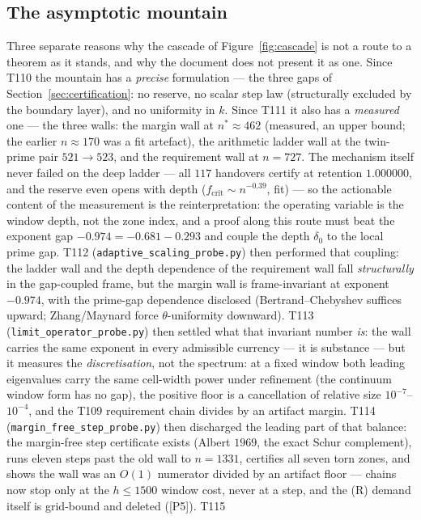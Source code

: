 \documentclass[11pt,a4paper]{article}
\begin{document}
\subsection{The asymptotic mountain}
Three separate reasons why the cascade of Figure~\ref{fig:cascade} is not a route to a theorem as it
stands, and why the document does not present it as one. Since T110 the mountain has a
\emph{precise} formulation --- the three gaps of Section~\ref{sec:certification}: no reserve, no
scalar step law (structurally excluded by the boundary layer), and no uniformity in $k$. Since T111
it also has a \emph{measured} one --- the three walls: the margin wall at $n^*\approx462$ (measured,
an upper bound; the earlier $n\approx170$ was a fit artefact), the arithmetic ladder wall at the
twin-prime pair $521\to523$, and the requirement wall at $n=727$. The mechanism itself never failed
on the deep ladder --- all $117$ handovers certify at retention $1.000000$, and the reserve even
opens with depth ($f_{\mathrm{crit}}\sim n^{-0.39}$, fit) --- so the actionable content of the
measurement is the reinterpretation: the operating variable is the window depth, not the zone index,
and a proof along this route must beat the exponent gap $-0.974=-0.681-0.293$ and couple the depth
$\delta_0$ to the local prime gap. T112 (\texttt{adaptive\_scaling\_probe.py}) then performed that
coupling: the ladder wall and the depth dependence of the requirement wall fall \emph{structurally}
in the gap-coupled frame, but the margin wall is frame-invariant at exponent $-0.974$, with the
prime-gap dependence disclosed (Bertrand--Chebyshev suffices upward; Zhang/Maynard force
$\theta$-uniformity downward). T113 (\texttt{limit\_operator\_probe.py}) then settled what that
invariant number \emph{is}: the wall carries the same exponent in every admissible currency --- it
is substance --- but it measures the \emph{discretisation}, not the spectrum: at a fixed window
both leading eigenvalues carry the same cell-width power under refinement (the continuum window
form has no gap), the positive floor is a cancellation of relative size $10^{-7}$--$10^{-4}$, and
the T109 requirement chain divides by an artifact margin. T114
(\texttt{margin\_free\_step\_probe.py}) then discharged the leading part of that balance: the
margin-free step certificate exists (Albert $1969$, the exact Schur complement), runs eleven
steps past the old wall to $n=1331$, certifies all seven torn zones, and shows the wall was an
$O(1)$ numerator divided by an artifact floor --- chains now stop only at the $h\le1500$ window
cost, never at a step, and the (R) demand itself is grid-bound and deleted ([P5]). T115
\end{document}
